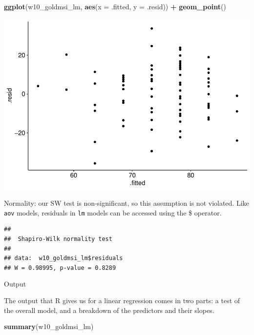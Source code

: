 \documentclass[
]{book}
\newenvironment{Shaded}{\begin{snugshade}}{\end{snugshade}}
\newcommand{\AttributeTok}[1]{\textcolor[rgb]{0.13,0.29,0.53}{#1}}
\newcommand{\FunctionTok}[1]{\textcolor[rgb]{0.13,0.29,0.53}{\textbf{#1}}}
\newcommand{\NormalTok}[1]{#1}
\newcommand{\SpecialCharTok}[1]{\textcolor[rgb]{0.81,0.36,0.00}{\textbf{#1}}}
\begin{document}
\begin{Shaded}
\begin{Highlighting}[]
\FunctionTok{ggplot}\NormalTok{(w10\_goldmsi\_lm, }\FunctionTok{aes}\NormalTok{(}\AttributeTok{x =}\NormalTok{ .fitted, }\AttributeTok{y =}\NormalTok{ .resid)) }\SpecialCharTok{+}
  \FunctionTok{geom\_point}\NormalTok{()}
\end{Highlighting}
\end{Shaded}

\includegraphics{_main_files/figure-latex/unnamed-chunk-213-1.pdf}

Normality: our SW test is non-significant, so this assumption is not violated. Like \texttt{aov} models, residuals in \texttt{lm} models can be accessed using the \$ operator.

\begin{Shaded}
\end{Shaded}

\begin{verbatim}
## 
##  Shapiro-Wilk normality test
## 
## data:  w10_goldmsi_lm$residuals
## W = 0.98995, p-value = 0.8289
\end{verbatim}

Output

The output that R gives us for a linear regression comes in two parts: a test of the overall model, and a breakdown of the predictors and their slopes.

\begin{Shaded}
\begin{Highlighting}[]
\FunctionTok{summary}\NormalTok{(w10\_goldmsi\_lm)}
\end{Highlighting}
\end{Shaded}
\end{document}
